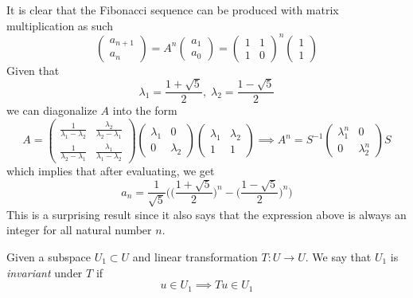 \documentclass{article}
\begin{document}
    \begin{example}
    It is clear that the Fibonacci sequence can be produced with matrix multiplication as such 
    \[ \begin{pmatrix}
    a_{n+1} \\ a_n
    \end{pmatrix} = A^n \begin{pmatrix}
    a_1 \\ a_0
    \end{pmatrix} = \begin{pmatrix}
    1&1\\1&0
    \end{pmatrix}^n \begin{pmatrix}
    1\\1
    \end{pmatrix}\]
    Given that 
    \[\lambda_1 = \frac{1+\sqrt{5}}{2}, \; \lambda_2 = \frac{1 - \sqrt{5}}{2}\]
    we can diagonalize $A$ into the form 
    \[A = \begin{pmatrix}
    \frac{1}{\lambda_1 - \lambda_2} & \frac{\lambda_2}{\lambda_2 - \lambda_1} \\
    \frac{1}{\lambda_2 - \lambda_1} & \frac{\lambda_1}{\lambda_1 - \lambda_2}
    \end{pmatrix} \begin{pmatrix}
    \lambda_1 & 0 \\ 0 & \lambda_2 
    \end{pmatrix} \begin{pmatrix}
    \lambda_1 & \lambda_2 \\
    1 & 1
    \end{pmatrix} \implies A^n = S^{-1} \begin{pmatrix}
    \lambda_1^n & 0 \\ 0 & \lambda_2^n 
    \end{pmatrix} S\]
    which implies that after evaluating, we get 
    \[ a_n = \frac{1}{\sqrt{5}} \bigg( \Big(\frac{1+\sqrt{5}}{2}\Big)^n - \Big(\frac{1-\sqrt{5}}{2}\Big)^n \bigg)\]
    This is a surprising result since it also says that the expression above is always an integer for all natural number $n$. 
    \end{example}
    \begin{definition}
    Given a subspace $U_1 \subset U$ and linear transformation $T: U \longrightarrow U$. We say that $U_1$ is \textit{invariant} under $T$ if 
    \[u \in U_1 \implies T u \in U_1\]
    \end{definition}
\end{document}
